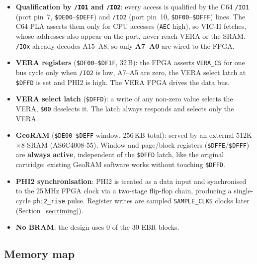 \documentclass[11pt,a4paper]{article}
\newcommand{\cmd}[1]{\texttt{#1}}
\newcommand{\sig}[1]{\texttt{#1}}
\newcommand{\hex}[1]{\texttt{\$#1}}
\begin{document}
\begin{itemize}[noitemsep]
    \item \textbf{Qualification by \sig{/IO1} and \sig{/IO2}}: every access
          is qualified by the C64 \sig{/IO1} (port pin~7, \hex{DE00}--\hex{DEFF})
          and \sig{/IO2} (port pin~10, \hex{DF00}--\hex{DFFF}) lines.  The C64
          PLA asserts them only for CPU accesses (\sig{AEC} high), so VIC-II
          fetches, whose addresses also appear on the port, never reach VERA
          or the SRAM.  \sig{/IOx} already decodes A15--A8, so only
          \textbf{A7--A0} are wired to the FPGA.
    \item \textbf{VERA registers} (\hex{DF00}--\hex{DF1F}, 32\,B): the FPGA
          asserts \sig{VERA\_CS} for one bus cycle only when \sig{/IO2} is
          low, A7--A5 are zero, the VERA select latch at \hex{DFFD} is set
          and PHI2 is high.  The VERA FPGA drives the data bus.
    \item \textbf{VERA select latch} (\hex{DFFD}): a write of any non-zero
          value selects the VERA, \texttt{\$00} deselects it.  The latch
          always responds and selects only the VERA.
    \item \textbf{GeoRAM} (\hex{DE00}--\hex{DEFF} window, 256\,KB total):
          served by an external 512K$\times$8 SRAM (AS6C4008-55).  Window and
          page/block registers (\hex{DFFE}/\hex{DFFF}) are \textbf{always
          active}, independent of the \hex{DFFD} latch, like the original
          cartridge: existing GeoRAM software works without touching
          \hex{DFFD}.
    \item \textbf{PHI2 synchronisation}: PHI2 is treated as a data input
          and synchronised to the 25\,MHz FPGA clock via a two-stage
          flip-flop chain, producing a single-cycle \cmd{phi2\_rise}
          pulse.  Register writes are sampled \cmd{SAMPLE\_CLKS} clocks later
          (Section~\ref{sec:timing}).
    \item \textbf{No BRAM}: the design uses 0 of the 30 EBR blocks.
\end{itemize}

\subsection{Memory map}
\end{document}
